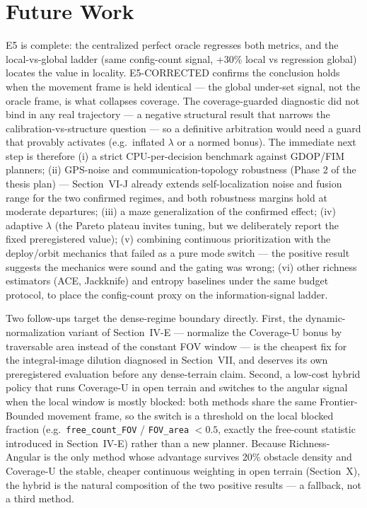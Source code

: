 \documentclass[journal]{IEEEtran}
\newcommand{\CU}{Coverage-U}
\newcommand{\RA}{Richness-Angular}
\begin{document}
\section{Future Work}
E5 is complete: the centralized perfect oracle regresses both metrics, and the
local-vs-global ladder (same config-count signal, +30\% local vs regression
global) locates the value in locality. E5-CORRECTED confirms the conclusion
holds when the movement frame is held identical --- the global under-set
signal, not the oracle frame, is what collapses coverage. The coverage-guarded
diagnostic did not bind in any real trajectory --- a negative structural result
that narrows the calibration-vs-structure question --- so a definitive
arbitration would need a guard that provably activates (e.g.\ inflated
$\lambda$ or a normed bonus). The immediate next step is therefore (i) a strict
CPU-per-decision benchmark against GDOP/FIM planners; (ii) GPS-noise and
communication-topology robustness (Phase 2 of the thesis plan) ---
Section~VI-J already extends self-localization noise and fusion range for the
two confirmed regimes, and both robustness margins hold at moderate departures;
(iii) a maze generalization of the confirmed effect; (iv) adaptive $\lambda$
(the Pareto plateau invites tuning, but we deliberately report the fixed
preregistered value); (v) combining continuous prioritization with the
deploy/orbit mechanics that failed as a pure mode switch --- the positive
result suggests the mechanics were sound and the gating was wrong; (vi) other
richness estimators (ACE, Jackknife) and entropy baselines under the same
budget protocol, to place the config-count proxy on the information-signal
ladder.

Two follow-ups target the dense-regime boundary directly. First, the
dynamic-normalization variant of Section~IV-E --- normalize the \CU{} bonus by
traversable area instead of the constant FOV window --- is the cheapest fix for
the integral-image dilution diagnosed in Section~VII, and deserves its own
preregistered evaluation before any dense-terrain claim. Second, a low-cost
hybrid policy that runs \CU{} in open terrain and switches to the angular
signal when the local window is mostly blocked: both methods share the same
Frontier-Bounded movement frame, so the switch is a threshold on the local
blocked fraction (e.g.\ \texttt{free\_count\_FOV} / \texttt{FOV\_area} $< 0.5$,
exactly the free-count statistic introduced in Section~IV-E) rather than a new
planner. Because \RA{} is the only method whose advantage survives 20\% obstacle
density and \CU{} the stable, cheaper continuous weighting in open terrain
(Section~X), the hybrid is the natural composition of the two positive results
--- a fallback, not a third method.
\end{document}
